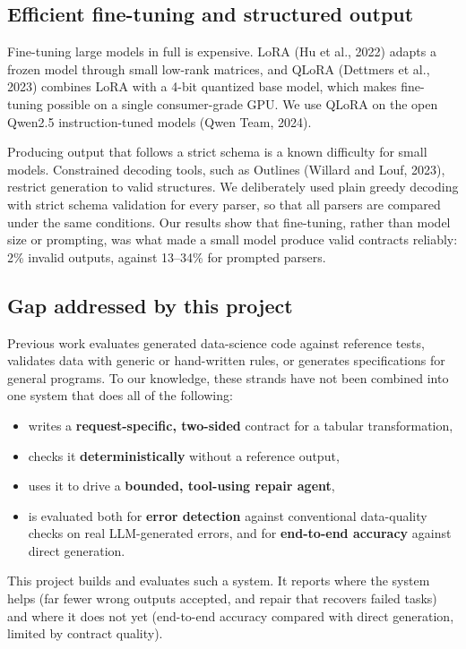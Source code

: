 \documentclass[11pt]{article}
\providecommand{\tightlist}{\setlength{\itemsep}{0pt}\setlength{\parskip}{0pt}}
\begin{document}
\subsection{Efficient fine-tuning and structured output}

Fine-tuning large models in full is expensive. LoRA (Hu et al., 2022)
adapts a frozen model through small low-rank matrices, and QLoRA
(Dettmers et al., 2023) combines LoRA with a 4-bit quantized base model,
which makes fine-tuning possible on a single consumer-grade GPU. We use
QLoRA on the open Qwen2.5 instruction-tuned models (Qwen Team, 2024).

Producing output that follows a strict schema is a known difficulty for
small models. Constrained decoding tools, such as Outlines (Willard and
Louf, 2023), restrict generation to valid structures. We deliberately
used plain greedy decoding with strict schema validation for every
parser, so that all parsers are compared under the same conditions. Our
results show that fine-tuning, rather than model size or prompting, was
what made a small model produce valid contracts reliably: 2\% invalid
outputs, against 13--34\% for prompted parsers.

\subsection{Gap addressed by this project}

Previous work evaluates generated data-science code against reference
tests, validates data with generic or hand-written rules, or generates
specifications for general programs. To our knowledge, these strands
have not been combined into one system that does all of the following:

\begin{itemize}
\tightlist
\item
  writes a \textbf{request-specific, two-sided} contract for a tabular
  transformation,
\item
  checks it \textbf{deterministically} without a reference output,
\item
  uses it to drive a \textbf{bounded, tool-using repair agent},
\item
  is evaluated both for \textbf{error detection} against conventional
  data-quality checks on real LLM-generated errors, and for
  \textbf{end-to-end accuracy} against direct generation.
\end{itemize}

This project builds and evaluates such a system. It reports where the
system helps (far fewer wrong outputs accepted, and repair that recovers
failed tasks) and where it does not yet (end-to-end accuracy compared
with direct generation, limited by contract quality).
\end{document}
